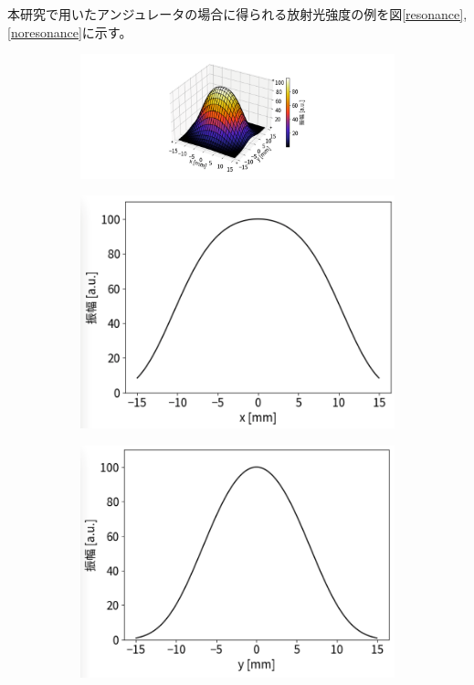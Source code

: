\documentclass[a4paper,11pt,uplatex]{jsbook}
\begin{document}
本研究で用いたアンジュレータの場合に得られる放射光強度の例を図\ref{resonance},\ref{noresonance}に示す。
\begin{figure}[h]
  \centering
  \begin{subfigure}[h]{\linewidth}
    \centering
    \includegraphics[width=0.8\linewidth]{image/2-spec_res.png}
  \end{subfigure}
  \hfill
  \vspace{1em}
  \begin{subfigure}[h]{0.35\linewidth}
    \centering
    \includegraphics[width=\linewidth]{image/2-spec_res_x.png}
  \end{subfigure}
  \hfill
  \begin{subfigure}[h]{0.35\linewidth}
    \centering
    \includegraphics[width=\linewidth]{image/2-spec_res_y.png}

\end{subfigure}
\end{figure}
\end{document}
